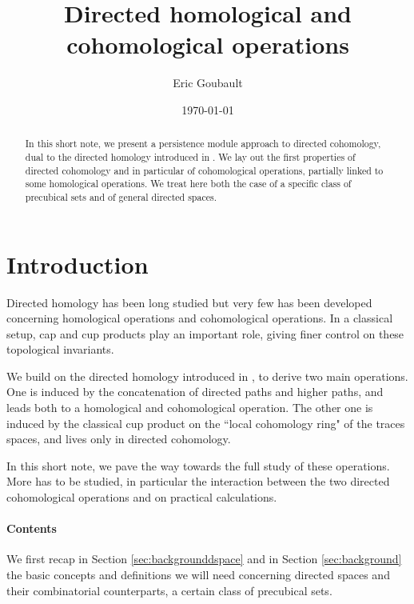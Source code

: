\documentclass{article}
\title{Directed homological and cohomological operations}
\author{Eric Goubault }
\date{\today}
\begin{document}
\maketitle

\begin{abstract}
In this short note, we present a persistence module approach to directed cohomology, dual to the directed homology introduced in \cite{directedpersistencemodule}. We lay out the first properties of directed cohomology and in particular of cohomological operations, partially linked to some homological operations. We treat here both the case of a specific class of precubical sets and of general directed spaces.
\end{abstract}

\section{Introduction}

Directed homology has been long studied \cite{concur92,directedpersistencemodule,grandis2004,fahrenberg2004directed,patchkoria2006,dubut2017} but very few has been developed concerning homological operations and cohomological operations. In a classical setup, cap and cup products play an important role, giving finer control on these topological invariants. 

We build on the directed homology introduced in \cite{directedpersistencemodule}, to derive two main operations. One is induced by the concatenation of directed paths and higher paths, and leads both to a homological and cohomological operation. The other one is induced by the classical cup product on the ``local cohomology ring" of the traces spaces, and lives only in directed cohomology. 

In this short note, we pave the way towards the full study of these operations. More has to be studied, in particular the interaction between the two directed cohomological operations and on practical calculations. 

\paragraph{Contents}

We first recap in Section \ref{sec:backgrounddspace} and in Section 
\ref{sec:background} the basic concepts and definitions we will need concerning directed spaces and their combinatorial counterparts, a certain class of precubical sets. 
\end{document}
